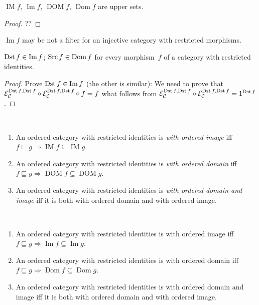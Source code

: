 \begin{prop}
$\operatorname{IM}f$, $\operatorname{Im}f$,
$\operatorname{DOM}f$, $\operatorname{Dom}f$
are upper sets.
\end{prop}

\begin{proof}
??
\end{proof}

\begin{conjecture}
$\operatorname{Im} f$ may be not a filter for an injective
category with restricted morphisms.
\end{conjecture}

\begin{prop}\label{dst-in-im}
$\operatorname{Dst} f\in\operatorname{Im} f$; $\operatorname{Src} f\in\operatorname{Dom} f$ for every morphism~$f$ of a category with restricted
identities.
\end{prop}

\begin{proof}
Prove $\operatorname{Dst} f\in\operatorname{Im} f$ (the other is similar):
We need to prove that $\mathcal{E}_{\mathcal{C}}^{\operatorname{Dst} f, \operatorname{Dst} f} \circ \mathcal{E}_{\mathcal{C}}^{\operatorname{Dst} f,
\operatorname{Dst} f} \circ f = f$ what follows from
$\mathcal{E}_{\mathcal{C}}^{\operatorname{Dst} f, \operatorname{Dst} f} \circ \mathcal{E}_{\mathcal{C}}^{\operatorname{Dst} f, \operatorname{Dst} f} = 1^{\operatorname{Dst} f}$.
\end{proof}

\begin{defn}
~
\begin{enumerate}
\item An ordered category with restricted identities is
\emph{with ordered image} iff $f\sqsubseteq g\Rightarrow
\operatorname{IM}f\subseteq\operatorname{IM}g$.
\item An ordered category with restricted identities is
\emph{with ordered domain} iff $f\sqsubseteq g\Rightarrow
\operatorname{DOM}f\subseteq\operatorname{DOM}g$.
\item An ordered category with restricted identities is
\emph{with ordered domain and image} iff it is both
with ordered domain and with ordered image.
\end{enumerate}
\end{defn}

\begin{obvious}
~
\begin{enumerate}
\item An ordered category with restricted identities is
with ordered image iff $f\sqsubseteq g\Rightarrow
\operatorname{Im}f\subseteq\operatorname{Im}g$.
\item An ordered category with restricted identities is
with ordered domain iff $f\sqsubseteq g\Rightarrow
\operatorname{Dom}f\subseteq\operatorname{Dom}g$.
\item An ordered category with restricted identities is
with ordered domain and image iff it is both
with ordered domain and with ordered image.
\end{enumerate}
\end{obvious}

